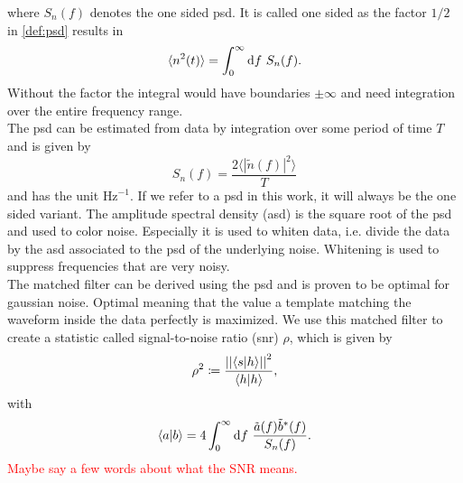 where $S_n(f)$ denotes the one sided \gls{psd}. It is called one sided as the factor $1/2$ in \eqref{def:psd} results in
\begin{equation}
\langle n^2(t)\rangle = \int_0^\infty\diff f\ S_n(f).
\end{equation}
Without the factor the integral would have boundaries $\pm\infty$ and need integration over the entire frequency range.\\
The \gls{psd} can be estimated from data by integration over some period of time $T$ and is given by
\begin{equation}\label{def:estimate_psd}
S_n(f)=\frac{2\langle {\left|\tilde{n}(f)\right|}^2\rangle}{T}
\end{equation}
and has the unit $\text{Hz}^{-1}$. If we refer to a \gls{psd} in this work, it will always be the one sided variant. The amplitude spectral density (\gls{asd}) is the square root of the \gls{psd} and used to color noise. Especially it is used to whiten data, i.e. divide the data by the \gls{asd} associated to the \gls{psd} of the underlying noise. Whitening is used to suppress frequencies that are very noisy.\smallskip\\
The matched filter can be derived using the \gls{psd} and is proven to be optimal for gaussian noise. Optimal meaning that the value a template matching the waveform inside the data perfectly is maximized. We use this matched filter to create a statistic called signal-to-noise ratio (\gls{snr}) $\rho$, which is given by \cite{pycbc_live}
\begin{equation}\label{def:snr_matched_filter}
\rho^2\coloneqq\frac{{\left|\left| \langle s|h\rangle \right|\right|}^2}{\langle h|h\rangle},
\end{equation}
with
\begin{equation}
\langle a|b\rangle = 4\int_0^\infty\diff f\ \frac{\tilde{a}(f)\tilde{b}^\ast(f)}{S_n(f)}.
\end{equation}
\textcolor{red}{Maybe say a few words about what the SNR means.}

